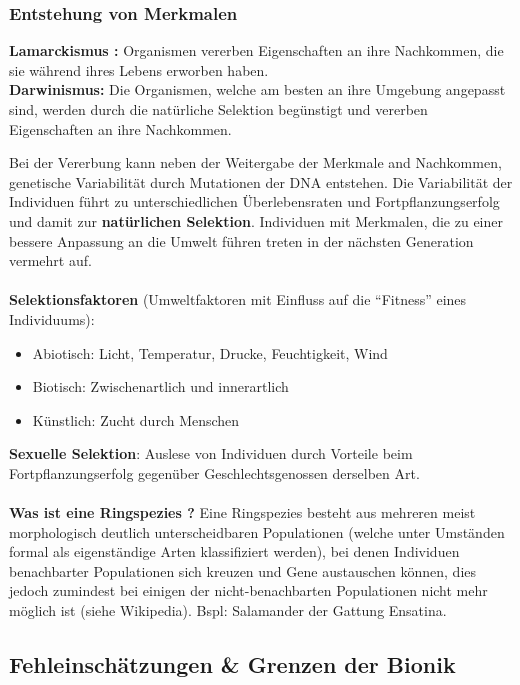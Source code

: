 \subsubsection{Entstehung von Merkmalen}

\textbf{Lamarckismus \dangersign:} Organismen vererben Eigenschaften an ihre Nachkommen, die sie während ihres Lebens erworben haben.
\\
\textbf{Darwinismus:} Die Organismen, welche am besten an ihre Umgebung angepasst sind, werden durch die natürliche Selektion begünstigt und vererben Eigenschaften an ihre Nachkommen. 

Bei der Vererbung kann neben der Weitergabe der Merkmale and Nachkommen, genetische Variabilität durch Mutationen der DNA entstehen.
Die Variabilität der Individuen führt zu unterschiedlichen
Überlebensraten und Fortpflanzungserfolg und damit zur \textbf{natürlichen Selektion}. Individuen mit Merkmalen, die zu einer bessere Anpassung an die Umwelt führen treten in der nächsten Generation vermehrt auf.
\\
\\
\textbf{Selektionsfaktoren} (Umweltfaktoren mit Einfluss auf die ``Fitness'' eines Individuums):
\begin{itemize}
	\item Abiotisch: Licht, Temperatur, Drucke, Feuchtigkeit, Wind
	\item Biotisch: Zwischenartlich und innerartlich
	\item Künstlich: Zucht durch Menschen
\end{itemize}
\textbf{Sexuelle Selektion}: Auslese von Individuen durch Vorteile beim Fortpflanzungserfolg gegenüber Geschlechtsgenossen derselben Art.
\\\\
\textbf{Was ist eine Ringspezies \dangersign?} Eine Ringspezies besteht aus mehreren meist morphologisch deutlich unterscheidbaren Populationen (welche unter Umständen formal als eigenständige Arten klassifiziert werden), bei denen Individuen benachbarter Populationen sich kreuzen und Gene austauschen können, dies jedoch zumindest bei einigen der nicht-benachbarten Populationen nicht mehr möglich ist (siehe Wikipedia). Bspl: Salamander der Gattung Ensatina.

\subsection{Fehleinschätzungen \& Grenzen der Bionik}


